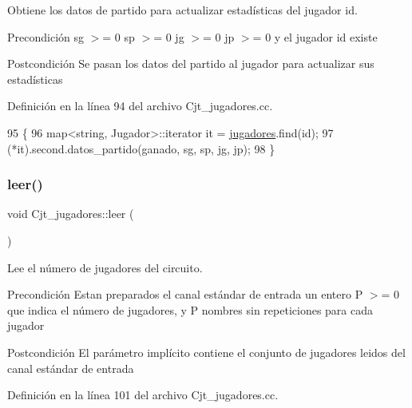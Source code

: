 Obtiene los datos de partido para actualizar estadísticas del jugador id. 

\begin{DoxyPrecond}{Precondición}
sg $>$= 0 sp $>$= 0 jg $>$= 0 jp $>$= 0 y el jugador id existe 
\end{DoxyPrecond}
\begin{DoxyPostcond}{Postcondición}
Se pasan los datos del partido al jugador para actualizar sus estadísticas 
\end{DoxyPostcond}


Definición en la línea 94 del archivo Cjt\+\_\+jugadores.\+cc.


\begin{DoxyCode}
95 \{
96   map<string, Jugador>::iterator it = \hyperlink{class_cjt__jugadores_ae3fc5f98e0f343b039bd7dff0e616ecc}{jugadores}.find(\textcolor{keywordtype}{id});
97   (*it).second.datos\_partido(ganado, sg, sp, jg, jp);
98 \}
\end{DoxyCode}
\mbox{\label{class_cjt__jugadores_a625e1ba48fc2f9b7c868820e1dc417f1}} 
\subsubsection{\texorpdfstring{leer()}{leer()}}
{\footnotesize\ttfamily void Cjt\+\_\+jugadores\+::leer (\begin{DoxyParamCaption}{ }\end{DoxyParamCaption})}



Lee el número de jugadores del circuito. 

\begin{DoxyPrecond}{Precondición}
Estan preparados el canal estándar de entrada un entero P $>$= 0 que indica el número de jugadores, y P nombres sin repeticiones para cada jugador 
\end{DoxyPrecond}
\begin{DoxyPostcond}{Postcondición}
El parámetro implícito contiene el conjunto de jugadores leidos del canal estándar de entrada 
\end{DoxyPostcond}


Definición en la línea 101 del archivo Cjt\+\_\+jugadores.\+cc.


